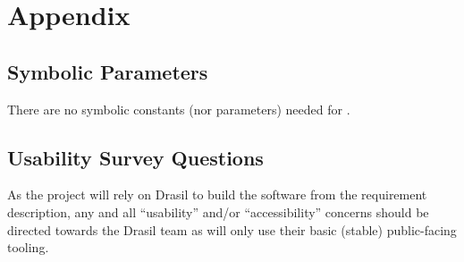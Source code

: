 \documentclass[12pt, titlepage]{article}
\begin{document}
\newpage{}

\section{Appendix}

\subsection{Symbolic Parameters}

There are no symbolic constants (nor parameters) needed for \progname{}.

\subsection{Usability Survey Questions}

As the project will rely on Drasil to build the software from the requirement
description, any and all ``usability'' and/or ``accessibility'' concerns should
be directed towards the Drasil team as \progname{} will only use their basic
(stable) public-facing tooling.
\end{document}
